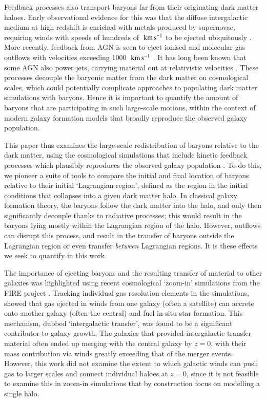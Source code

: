 Feedback processes also transport baryons far from their originating dark
matter haloes. Early observational evidence for this was that the diffuse
intergalactic medium at high redshift is enriched with metals produced by
supernovae, requiring winds with speeds of hundreds of $\;{\rm km}\,{\rm s}^{-1}{}$ to be ejected
ubiquitously \citep[e.g.][]{Aguirre2001, Springel2003, Oppenheimer2006}. More
recently, feedback from AGN is seen to eject ionised and molecular gas
outflows with velocities exceeding 1000 $\;{\rm km}\,{\rm s}^{-1}{}$
\citep[e.g.][]{Sturm2001, Greene2012, Maiolino2012, Zakamska2016}. It has
long been known that some AGN also power jets, carrying material out at
relativistic velocities \citep{Fabian2012}. These processes decouple the
baryonic matter from the dark matter on cosmological scales, which could
potentially complicate approaches to populating dark matter simulations with
baryons. Hence it is important to quantify the amount of baryons that are
participating in such large-scale motions, within the context of modern
galaxy formation models that broadly reproduce the observed galaxy
population.

This paper thus examines the large-scale redistribution of baryons relative to the
dark matter, using the \simba{} cosmological simulations that include kinetic
feedback processes which plausibly reproduces the observed galaxy population
\citep{Dave2019}. To do this, we pioneer a suite of tools to compare the
initial and final location of baryons relative to their initial `Lagrangian
region', defined as the region in the initial conditions that collapses into
a given dark matter halo. In classical galaxy formation theory, the baryons
follow the dark matter into the halo, and only then significantly decouple
thanks to radiative processes; this would result in the baryons lying mostly
within the Lagrangian region of the halo. However, outflows can disrupt this
process, and result in the transfer of baryons outside the Lagrangian region
or even transfer \emph{between} Lagrangian regions. It is these effects we
seek to quantify in this work.

The importance of ejecting baryons and the resulting transfer of material to
other galaxies was highlighted using recent cosmological `zoom-in'
simulations from the FIRE project \citep{Hopkins2014,Hopkins2018}. Tracking
individual gas resolution elements in the simulations,
\citet{AnglesAlcazar2017} showed that gas ejected in winds from one galaxy
(often a satellite) can accrete onto another galaxy (often the central) and
fuel in-situ star formation. This mechanism, dubbed `intergalactic transfer',
was found to be a significant contributor to galaxy growth. The galaxies that
provided intergalactic transfer material often ended up merging with the
central galaxy by $z=0$, with their mass contribution via winds greatly
exceeding that of the merger events. However, this work did not examine the
extent to which galactic winds can push gas to larger scales and connect
individual haloes at $z=0$, since it is not feasible to examine this in
zoom-in simulations that by construction focus on modelling a single halo.

